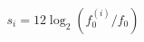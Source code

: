 \documentclass[preview]{standalone}
\begin{document}
\begin{align*}
s_i = 12 \log_2(f_0^{(i)} / f_0)
\end{align*}
\end{document}

